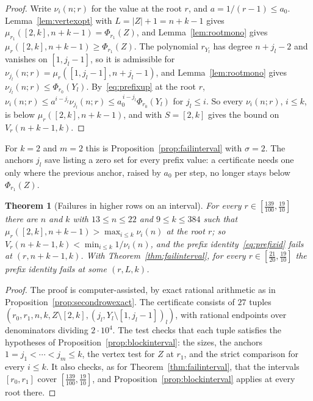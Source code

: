 \documentclass[11pt]{article}
\newtheorem{theorem}{Theorem}[section]
\begin{document}
\begin{proof}
Write $\nu_i(n;r)$ for the value at the root $r$, and $a=1/(r-1)\le a_0$.
Lemma~\ref{lem:vertexopt} with $L=|Z|+1=n+k-1$ gives
$\mu_{r_1}([2,k],n+k-1)=\Phi_{r_1}(Z)$, and Lemma~\ref{lem:rootmono} gives
$\mu_r([2,k],n+k-1)\ge\Phi_{r_1}(Z)$.  The polynomial $r_{Y_l}$ has degree
$n+j_l-2$ and vanishes on $[1,j_l-1]$, so it is admissible for
$\nu_{j_l}(n;r)=\mu_r([1,j_l-1],n+j_l-1)$, and Lemma~\ref{lem:rootmono}
gives $\nu_{j_l}(n;r)\le\Phi_{r_0}(Y_l)$.  By~\eqref{eq:prefixup} at the
root $r$, $\nu_i(n;r)\le a^{i-j_l}\nu_{j_l}(n;r)\le
a_0^{\,i-j_l}\Phi_{r_0}(Y_l)$ for $j_l\le i$.  So every $\nu_i(n;r)$,
$i\le k$, is below $\mu_r([2,k],n+k-1)$, and
\cite[Proposition~2.1(b)]{coefficient-mass-rows} with $S=[2,k]$ gives the bound on
$V_r(n+k-1,k)$.
\end{proof}

For $k=2$ and $m=2$ this is Proposition~\ref{prop:failinterval} with
$\sigma=2$.  The anchors $j_l$ save listing a zero set for every prefix
value: a certificate needs one only where the previous anchor, raised by
$a_0$ per step, no longer stays below $\Phi_{r_1}(Z)$.

\begin{theorem}[Failures in higher rows on an interval]\label{thm:blockinterval}
For every $r\in[\frac{139}{100},\frac{19}{10}]$ there are $n$ and $k$ with
$13\le n\le22$ and $9\le k\le384$ such that
$\mu_r([2,k],n+k-1)>\max_{i\le k}\nu_i(n)$ at the root $r$; so
$V_r(n+k-1,k)<\min_{i\le k}1/\nu_i(n)$, and the prefix
identity~\eqref{eq:prefixid} fails at $(r,n+k-1,k)$.  With
Theorem~\ref{thm:failinterval}, for every $r\in[\frac{21}{20},\frac{19}{10}]$
the prefix identity fails at some $(r,L,k)$.
\end{theorem}

\begin{proof}
The proof is computer-assisted, by exact rational arithmetic as in
Proposition~\ref{prop:secondrowexact}.  The certificate consists of
$27$ tuples $(r_0,r_1,n,k,Z\setminus[2,k],(j_l,Y_l\setminus[1,j_l-1])_l)$,
with rational endpoints over denominators dividing $2\cdot10^4$.  The test
checks that each tuple satisfies the hypotheses of
Proposition~\ref{prop:blockinterval}: the sizes, the anchors
$1=j_1<\cdots<j_m\le k$, the vertex test for $Z$ at
$r_1$, and the strict comparison for every $i\le k$.  It also checks, as for
Theorem~\ref{thm:failinterval}, that the intervals $[r_0,r_1]$ cover
$[\frac{139}{100},\frac{19}{10}]$, and Proposition~\ref{prop:blockinterval}
applies at every root there.
\end{proof}
\end{document}
